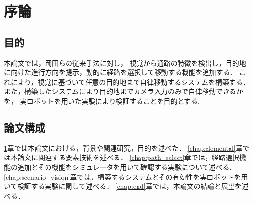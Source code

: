 \chapter{序論}
\label{chap:introduction}
%
%
%

%
% 
\newpage

\newpage
\section{目的}
本論文では，岡田らの従来手法に対し，
視覚から通路の特徴を検出し，目的地に向けた進行方向を提示，動的に経路を選択して移動する機能を追加する．
これにより，視覚に基づいて任意の目的地まで自律移動するシステムを構築する．
また，構築したシステムにより目的地までカメラ入力のみで自律移動できるかを，
実ロボットを用いた実験により検証することを目的とする.

\section{論文構成}
\ref{chap:introduction}章では本論文における，背景や関連研究，目的を述べた．
\ref{chap:elemental}章では本論文に関連する要素技術を述べる．
\ref{chap:path_select}章では，経路選択機能の追加とその機能をシミュレータを用いて確認する実験について述べる．
\ref{chap:scenario_vision}章では，構築するシステムとその有効性を実ロボットを用いて検証する実験に関して述べる．
\ref{chap:end}章では，本論文の結論と展望を述べる．